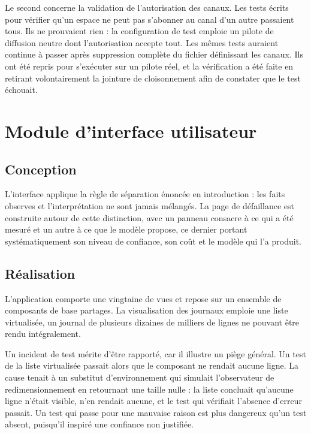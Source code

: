 \documentclass[12pt,a4paper,oneside]{report}
\begin{document}
Le second concerne la validation de l'autorisation des canaux. Les tests écrits
pour vérifier qu'un espace ne peut pas s'abonner au canal d'un autre passaient
tous. Ils ne prouvaient rien : la configuration de test emploie un pilote de
diffusion neutre dont l'autorisation accepte tout. Les mêmes tests auraient
continue à passer après suppression complète du fichier définissant les canaux.
Ils ont été repris pour s'exécuter sur un pilote réel, et la vérification a été
faite en retirant volontairement la jointure de cloisonnement afin de constater
que le test échouait.

\section{Module d'interface utilisateur}

\subsection{Conception}

L'interface applique la règle de séparation énoncée en introduction : les faits
observes et l'interprétation ne sont jamais mélangés. La page de défaillance est
construite autour de cette distinction, avec un panneau consacre à ce qui a été
mesuré et un autre à ce que le modèle propose, ce dernier portant systématiquement
son niveau de confiance, son coût et le modèle qui l'a produit.

\subsection{Réalisation}

L'application comporte une vingtaine de vues et repose sur un ensemble de
composants de base partages. La visualisation des journaux emploie une liste
virtualisée, un journal de plusieurs dizaines de milliers de lignes ne pouvant
être rendu intégralement.

Un incident de test mérite d'être rapporté, car il illustre un piège général. Un
test de la liste virtualisée passait alors que le composant ne rendait aucune
ligne. La cause tenait à un substitut d'environnement qui simulait
l'observateur de redimensionnement en retournant une taille nulle : la liste
concluait qu'aucune ligne n'était visible, n'en rendait aucune, et le test qui
vérifiait l'absence d'erreur passait. Un test qui passe pour une mauvaise raison
est plus dangereux qu'un test absent, puisqu'il inspiré une confiance non
justifiée.
\end{document}
